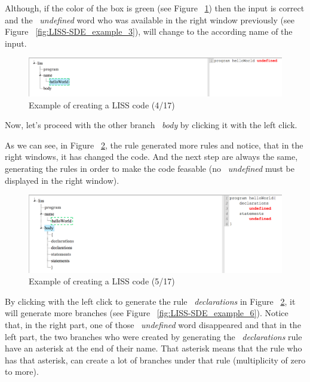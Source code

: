 \documentclass[
  oneside,
  11pt, a4paper,
  footinclude=true,
  headinclude=true,
  cleardoublepage=empty
]{scrbook}
\begin{document}
Although, if the color of the box is green (see Figure ~\ref{fig:LISS-SDE_example_4}) then the input is correct and the ~\textit{undefined} word who was available in the right window previously (see Figure ~\ref{fig:LISS-SDE_example_3}), will change to the according name of the input.

\begin{figure}[h!]
  \centering
    \includegraphics[width=1\textwidth]{img/LISS-SDE_creating_program/LISS-SDE4.png}
    \caption{Example of creating a LISS code (4/17)}
    \label{fig:LISS-SDE_example_4}
\end{figure}

Now, let's proceed with the other branch ~\textit{body} by clicking it with the left click. 

As we can see, in Figure ~\ref{fig:LISS-SDE_example_5}, the rule generated more rules and notice, that in the right windows, it has changed the code.  And the next step are always the same, generating the rules in order to make the code feasable (no ~\textit{undefined} must be displayed in the right window).

\begin{figure}[h!]
  \centering
    \includegraphics[width=1\textwidth]{img/LISS-SDE_creating_program/LISS-SDE5.png}
    \caption{Example of creating a LISS code (5/17)}
    \label{fig:LISS-SDE_example_5}
\end{figure}

By clicking with the left click to generate the rule ~\textit{declarations} in Figure ~\ref{fig:LISS-SDE_example_5}, it will generate more branches (see Figure ~\ref{fig:LISS-SDE_example_6}). Notice that, in the right part, one of those ~\textit{undefined} word disappeared and that in the left part, the two branches who were created by generating the ~\textit{declarations} rule have an asterisk at the end of their name. That asterisk means that the rule who has that asterisk, can create a lot of branches under that rule (multiplicity of zero to more).
\end{document}
